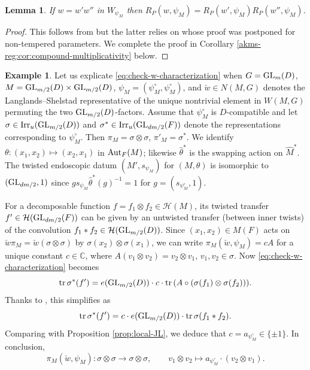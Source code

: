 \documentclass[11pt,reqno]{amsart}
\theoremstyle{plain}
\newtheorem{lem}[thm]{Lemma}
\theoremstyle{definition}
\newtheorem{ex}[thm]{Example}
\newcommand{\C}{\mathbb{C}}
\newcommand{\tr}{\tu{tr}\,}
\newcommand{\Aut}{\tu{Aut}}
\newcommand{\GL}{\tu{GL}}
\newcommand{\Irr}{\tu{Irr}}
\newcommand{\tu}{\textup}
\renewcommand{\hat}{\widehat}
\numberwithin{equation}{subsection}
\begin{document}
\begin{lem}\label{lem:mult}
If $w=w'w''$ in $W_{\psi_M}$ then $R_P(w,\psi_{M})=R_P(w',\psi_{M})R_P(w'',\psi_{M})$. 
\end{lem}

\begin{proof}
This follows from \cite[Lem.~2.5.3]{KMSW} but the latter relies on \cite[Lem.~2.2.4]{KMSW} whose proof was postponed for non-tempered parameters.
We complete the proof in Corollary \ref{akms-reg:cor:compound-multiplicativity} below.
\end{proof}



\begin{ex}\label{ex:weyl-action}
Let us explicate \eqref{eq:check-w-characterization} when $G=\GL_m(D)$, $M=\GL_{m/2}(D)\times \GL_{m/2}(D)$, $\psi_M=(\psi^\circ_M,\psi^\circ_M)$, and $\breve w\in N(M,G)$ denotes the Langlands--Shelstad representative of 
the unique nontrivial element in $W(M,G)$ 
permuting the two $\GL_{m/2}(D)$-factors. Assume that $\psi^\circ_M$ is $D$-compatible and let $\sigma\in \Irr_u(\GL_{m/2}(D))$ and $\sigma^*\in \Irr_u(\GL_{dm/2}(F))$ denote the representations corresponding to $\psi^\circ_M$. 
Then $\pi_M=\sigma\otimes \sigma$, $\pi'_M=\sigma^*$. We identify $\theta\colon (x_1,x_2)\mapsto (x_2,x_1)$ in $\Aut_F(M)$; likewise $\hat \theta^*$ is the swapping action on $\hat M^*$. The twisted endoscopic datum $(M',s_{\psi_M})$ for $(M,\theta)$ is isomorphic to $(\GL_{dm/2},1)$ since $g s_{\psi_M}\hat\theta^*(g)^{-1}=1$ for $g=(s_{\psi_M^\circ},1)$.

For a decomposable function $f=f_1\otimes f_2\in \mathcal H(M)$, its twisted transfer $f'\in \mathcal H(\GL_{dm/2}(F))$ can be given by an untwisted transfer (between inner twists) of the convolution $f_1*f_2\in \mathcal H(\GL_{m/2}(D))$. 
Since $(x_1,x_2)\in M(F)$ acts on $\breve w \pi_M=\breve w(\sigma\otimes \sigma)$ by $\sigma(x_2)\otimes\sigma(x_1)$, we can write $\pi_M(\breve{w},\psi_M)= c A$ for a unique constant $c\in \C$, where $A(v_1\otimes v_2)=v_2\otimes v_1$, $v_1,v_2\in \sigma$. Now \eqref{eq:check-w-characterization} becomes
\[
\tr \sigma^*(f') = e(\GL_{m/2}(D))\cdot c \cdot \tr (A\circ (\sigma(f_1)\otimes \sigma(f_2))).
\]
Thanks to \cite[\S1.1.3]{KMSW}, this simplifies as 
\[
\tr \sigma^*(f') = c \cdot e(\GL_{m/2}(D)) \cdot \tr \sigma(f_1*f_2).
\]
Comparing with Proposition \ref{prop:local-JL}, we deduce that $c=a_{\psi_M^\circ}\in \{\pm1\}$.
In conclusion,
\begin{equation}\label{eq:w-action-vs-permutation}
\pi_M(\breve{w},\psi_M)\colon \sigma\otimes \sigma\to \sigma\otimes \sigma,\qquad v_1\otimes v_2\mapsto a_{\psi_M^\circ}\cdot (v_2\otimes v_1).
\end{equation}
\end{ex}
\end{document}
